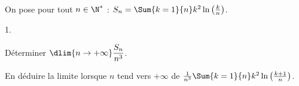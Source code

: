 \documentclass[11pt]{article}%
\begin{document}

\begin{exerciceSP}~\\
  On pose pour tout $n \in \N^*$ : $S_n = \Sum{k=1}{n} k^2
  \ln \left( \frac{ k }{ n } \right)$.
  \begin{noliste}{1.}
    \setlength{\itemsep}{2mm}
  \item Déterminer $\dlim{n \rightarrow + \infty} \dfrac{S_n}{ n^3}$.

  \item En déduire la limite lorsque $n$ tend vers $+\infty$ de
    $\frac{1}{n^3} \Sum{k=1}{n} k^2 \ln \left( \frac{ k+1 }{ n }
    \right)$.

  \end{noliste}
\end{exerciceSP}




\end{document}
